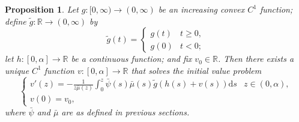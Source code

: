 \documentclass{article}
\newtheorem{prop}[thm]{Proposition}
\begin{document}
    
    \begin{prop}
        Let $g:\mathbb [0,\infty)\to(0,\infty)$ be an increasing convex $C^1$ function; define $\tilde g:\mathbb R\to(0,\infty)$ by
        \[\tilde g(t) = \begin{cases}g(t) & t\geq 0, \\ g(0) & t < 0;\end{cases}\]let $h:[0,\alpha]\to \mathbb R$ be a continuous function; and fix $v_0 \in\mathbb R$. Then there exists a unique $C^1$ function $v:[0,\alpha]\to\mathbb R$ that solves the initial value problem
        \[\begin{cases}v'(z) = -\frac{1}{z\bar\mu(z)}\int_0^z \bar\psi(s)\bar\mu(s)\tilde g(h(s)+v(s))\mathrm{d}s & z\in(0,\alpha), \\ v(0) = v_0,\end{cases}\]
        where $\bar{\psi}$ and $\bar{\mu}$ are as defined in previous sections.
    \end{prop}
\end{document}
